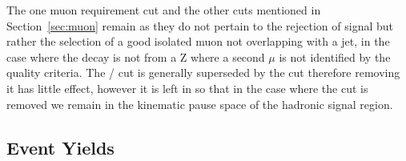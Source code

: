 The one muon requirement cut and the other cuts mentioned in Section~\ref{sec:muon} remain as they do not pertain to the rejection of signal but rather the selection of a good isolated muon not overlapping with a jet, in the case where the decay is not from a Z where a second $\mu$ is not identified by the quality criteria. The \MHT / \HT cut is generally superseded by the \alt cut therefore removing it has little effect, however it is left in so that in the case where the \alt cut is removed we remain in the kinematic pause space of the hadronic signal region. 

 

\subsection{Event Yields}

